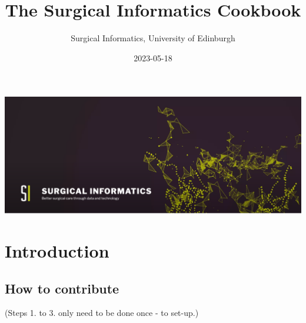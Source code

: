 \documentclass[
]{book}
\title{The Surgical Informatics Cookbook}
\author{Surgical Informatics, University of Edinburgh}
\date{2023-05-18}
\begin{document}
\maketitle

{
\setcounter{tocdepth}{1}
\tableofcontents
}
\hypertarget{section}{%
\chapter*{}\label{section}}

\includegraphics[width=30.97in]{img/surgical_informatics_minibanner}

\hypertarget{introduction}{%
\chapter{Introduction}\label{introduction}}

\hypertarget{how-to-contribute}{%
\section{How to contribute}\label{how-to-contribute}}

(Steps 1. to 3. only need to be done once - to set-up.)
\end{document}
